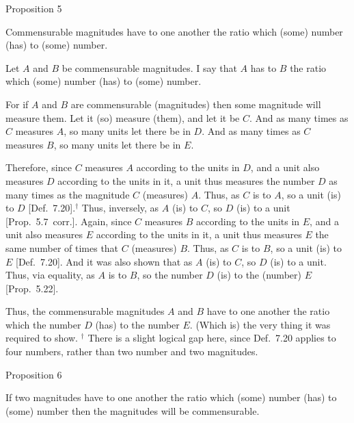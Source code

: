 
\begin{center}
{\large Proposition 5}
\end{center}

Commensurable magnitudes have to one another the
ratio which (some) number (has) to (some) number.

\epsfysize=0.8in
\centerline{}

Let $A$ and $B$ be commensurable magnitudes. I say that $A$ has to $B$
the ratio which (some) number (has) to (some) number.

For if $A$ and $B$ are commensurable (magnitudes) then some magnitude
will measure them. Let it (so) measure (them), and let it be $C$. And
as many times as $C$ measures $A$, so many units let there be in
$D$. And as many times as $C$ measures $B$, so many units let there be
in $E$.

Therefore, since $C$ measures $A$ according to the units in $D$, and
a unit also measures $D$ according to the units in it,  a unit thus measures the
number $D$ as many times as the magnitude $C$ (measures) $A$. 
Thus, as $C$ is to $A$, so a unit (is) to $D$ [Def.~7.20].$^\dag$ Thus, inversely, as $A$ (is) to $C$, so
$D$ (is) to a unit [Prop.~5.7~corr.]. Again, since
$C$ measures $B$ according to the units in $E$, and a unit also measures $E$ according to the units in it,   a unit thus measures $E$ the
same number of times that $C$ (measures) $B$. Thus, as $C$ is to $B$, so
a unit (is) to $E$ [Def.~7.20]. And it was also
shown that as $A$ (is) to $C$, so $D$ (is) to a unit. Thus, via equality,
as $A$ is to $B$, so the number $D$ (is) to the (number) $E$ [Prop.~5.22].

Thus, the commensurable magnitudes $A$ and $B$ have to one another
the ratio which the number $D$ (has) to the number $E$. (Which is) the
very thing it was required to show.
{\footnotesize\noindent$^\dag$ There is a slight logical gap here, since Def.~7.20  applies to four numbers, rather than two number and two magnitudes.}


\begin{center}
{\large Proposition 6}
\end{center}

If two magnitudes have to one another the ratio
which (some) number (has) to (some) number then the magnitudes
will be commensurable.

